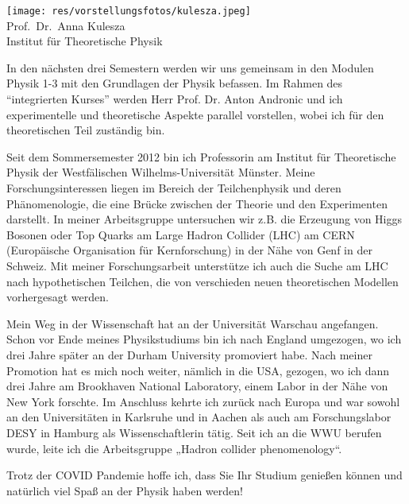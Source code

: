 \begin{multicols}{2}
\begin{center}
\texttt{[image: res/vorstellungsfotos/kulesza.jpeg]}\\
\smallskip
Prof.\ Dr.\ Anna Kulesza\\
Institut für Theoretische Physik
\end{center}

In den nächsten drei Semestern werden wir uns gemeinsam in den Modulen Physik 1-3 mit den Grundlagen der Physik befassen. Im Rahmen des “integrierten Kurses” werden Herr Prof. Dr. Anton Andronic und ich experimentelle und theoretische Aspekte parallel vorstellen, wobei ich für den theoretischen Teil zuständig bin.

Seit dem Sommersemester 2012 bin ich Professorin am Institut für Theoretische Physik der Westfälischen Wilhelms-Universität Münster. Meine Forschungsinteressen liegen im Bereich der Teilchenphysik und deren Phänomenologie, die eine Brücke zwischen der Theorie und den Experimenten darstellt. In meiner Arbeitsgruppe untersuchen wir z.B. die Erzeugung von Higgs Bosonen oder Top Quarks am Large Hadron Collider (LHC) am CERN (Europäische Organisation für Kernforschung) in der Nähe von Genf in der Schweiz. Mit meiner Forschungsarbeit unterstütze ich auch die Suche am LHC nach hypothetischen Teilchen, die von verschieden neuen theoretischen Modellen vorhergesagt werden. 

Mein Weg in der Wissenschaft hat an der Universität Warschau angefangen. Schon vor Ende meines Physikstudiums bin ich nach England umgezogen, wo ich drei Jahre später an der Durham University promoviert habe. Nach meiner Promotion hat es mich noch weiter, nämlich in die USA, gezogen, wo ich dann drei Jahre am Brookhaven National Laboratory, einem Labor in der Nähe von New York forschte. Im Anschluss kehrte ich zurück nach Europa und war sowohl an den Universitäten in Karlsruhe und in Aachen als auch am Forschungslabor DESY in Hamburg als Wissenschaftlerin tätig. Seit ich an die WWU berufen wurde, leite ich die Arbeitsgruppe „Hadron collider phenomenology“. 

Trotz der COVID Pandemie hoffe ich, dass Sie Ihr Studium genießen können und natürlich viel Spaß an der Physik haben werden!

\end{multicols}

\vspace*{\fill}

\begin{center}
\end{center}

\vfill
